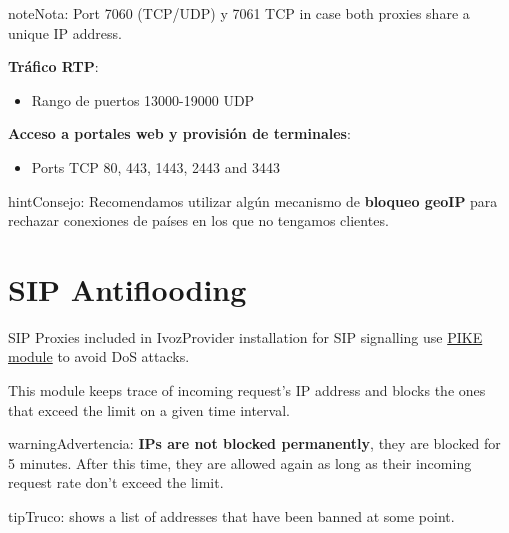 \documentclass[letterpaper,10pt,spanish]{sphinxmanual}
\begin{document}
\begin{notice}{note}{Nota:}
Port 7060 (TCP/UDP) y 7061 TCP in case both proxies share a unique IP address.
\end{notice}

\textbf{Tráfico RTP}:
\begin{itemize}
\item {} 
Rango de puertos 13000-19000 UDP

\end{itemize}

\textbf{Acceso a portales web y provisión de terminales}:
\begin{itemize}
\item {} 
Ports TCP 80, 443, 1443, 2443 and 3443

\end{itemize}

\begin{notice}{hint}{Consejo:}
Recomendamos utilizar algún mecanismo de \textbf{bloqueo geoIP} para rechazar conexiones de países en los que no tengamos clientes.
\end{notice}


\section{SIP Antiflooding}
\label{security_and_maintenance/security/antiflooding::doc}\label{security_and_maintenance/security/antiflooding:sip-antiflooding}
SIP Proxies included in IvozProvider installation for SIP signalling use
\href{http://kamailio.org/docs/modules/5.1.x/modules/pike.html}{PIKE module} to avoid DoS attacks.

This module keeps trace of incoming request's IP address and blocks the ones that exceed the limit on a given time
interval.

\begin{notice}{warning}{Advertencia:}
\textbf{IPs are not blocked permanently}, they are blocked for 5 minutes. After this time, they are allowed again
as long as their incoming request rate don't exceed the limit.
\end{notice}

\begin{notice}{tip}{Truco:}
{\hyperref[administration_portal/platform/antiflood_banned_ips:antiflood\string-banned\string-ips]{}} shows a list of addresses that have been banned at some point.
\end{notice}
\end{document}
